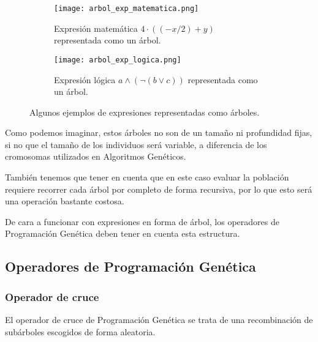 \begin{figure}[H]
    \centering
	 \begin{subfigure}[b]{0.49\textwidth}
		 \centering
		 \texttt{[image: arbol\_exp\_matematica.png]}
		 \caption{Expresión matemática $4 \cdot ( (-x / 2) + y)$ representada como un árbol.}
		 \label{fig:exp_matematica}
	 \end{subfigure}
	 \begin{subfigure}[b]{0.49\textwidth}
		 \centering
		\texttt{[image: arbol\_exp\_logica.png]}
		\caption{Expresión lógica $ a \wedge (\neg (b \vee c) ) $ representada como un árbol.}
		\label{fig:exp_logica}
   \end{subfigure}
	\caption{Algunos ejemplos de expresiones representadas como árboles.}
	\label{fig:arbol_exp}
\end{figure}

Como podemos imaginar, estos árboles no son de un tamaño ni profundidad fijas, si no que el tamaño de los individuos será variable, a diferencia de los cromosomas utilizados en Algoritmos Genéticos.

También tenemos que tener en cuenta que en este caso evaluar la población requiere recorrer cada árbol por completo de forma recursiva, por lo que esto será una operación bastante costosa.

De cara a funcionar con expresiones en forma de árbol, los operadores de Programación Genética deben tener en cuenta esta estructura.

\subsection{Operadores de Programación Genética}

\subsubsection{Operador de cruce}

El operador de cruce de Programación Genética se trata de una recombinación de subárboles escogidos de forma aleatoria.

